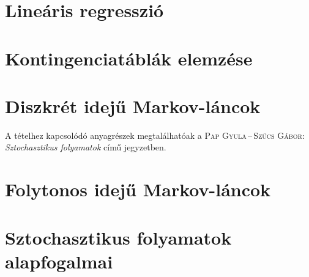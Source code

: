 \documentclass[DIV=15,appendixprefix]{scrreprt}
\theoremstyle{definition}
\theoremstyle{remark}
\begin{document}
\section{Lineáris regresszió}
%
\section{Kontingenciatáblák elemzése}
%
\section{Diszkrét idejű Markov-láncok}
A tételhez kapcsolódó anyagrészek megtalálhatóak a \textsc{Pap Gyula\,--\,Szűcs Gábor}:
\emph{Sztochasztikus folyamatok} \cite{PapSzucs} című jegyzetben.
%
\section{Folytonos idejű Markov-láncok}
%
\section{Sztochasztikus folyamatok alapfogalmai}
%
\end{document}
